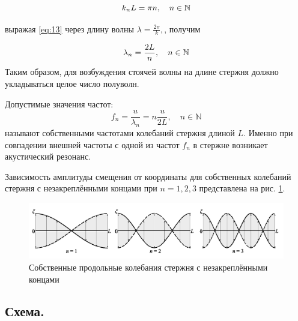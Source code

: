 \documentclass[a4paper,12pt]{article}
\numberwithin{equation}{section}
\begin{document}
\begin{equation}
  k_n L = \pi n, \quad n \in \mathbb{N}
  \label{eq:13}
\end{equation}

выражая \eqref{eq:13} через длину волны $\lambda = \frac{2 \pi}{k},$, получим

\begin{equation}
  \lambda_n = \frac{2L}{n}, \quad n \in \mathbb{N}
  \label{eq:14}
\end{equation}
Таким образом, для возбуждения стоячей волны на длине стержня должно укладываться целое число полуволн.

Допустимые значения частот:
\begin{equation}
  f_n = \frac{u}{\lambda_n} = n \frac{u}{2L}, \quad n \in \mathbb{N}
  \label{eq:15}
\end{equation}
называют собственными частотами колебаний стержня длиной $L$. Именно при совпадении внешней частоты с одной из частот $f_n$ в стержне возникает акустический резонанс.
        
Зависимость амплитуды смещения от координаты для собственных колебаний стержня с незакреплёнными концами при $n = 1,2,3$ представлена на рис. \ref{pic:2}.

\begin{figure} [H] \center
  \includegraphics[scale=0.4]{data/pic2.png}
  \caption[Гармоники]{Собственные продольные колебания стержня с незакреплёнными концами}
  \label{pic:2}
\end{figure}

\subsection{Схема.}
\end{document}
